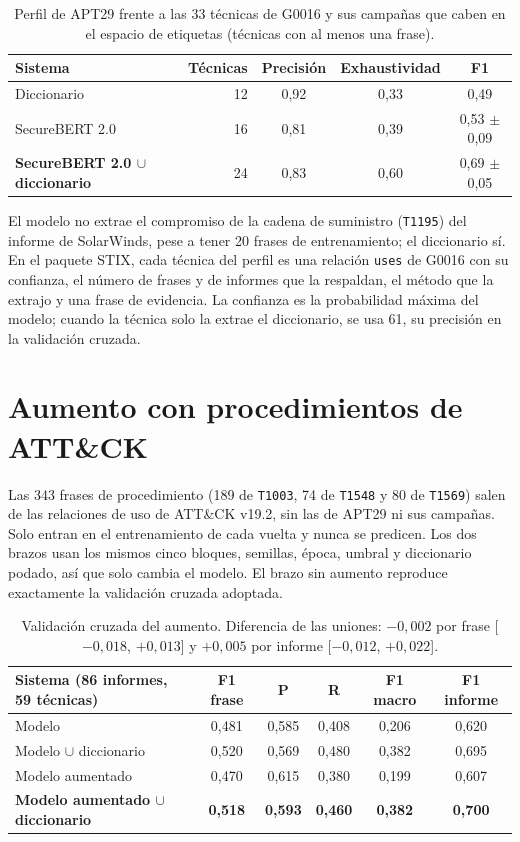 \begin{table}[H]
\centering
\begin{tabular}{|l|r|c|c|c|}
\hline
\textbf{Sistema} & \textbf{Técnicas} & \textbf{Precisión} & \textbf{Exhaustividad} & \textbf{F1} \\
\hline
Diccionario & 12 & 0,92 & 0,33 & 0,49 \\
SecureBERT 2.0 & 16 & 0,81 & 0,39 & 0,53 $\pm$ 0,09 \\
\textbf{SecureBERT 2.0 $\cup$ diccionario} & 24 & 0,83 & 0,60 & 0,69 $\pm$ 0,05 \\
\hline
\end{tabular}
\caption{Perfil de APT29 frente a las 33 técnicas de G0016 y sus campañas que caben en el espacio
de etiquetas (técnicas con al menos una frase).}
\end{table}

El modelo no extrae el compromiso de la cadena de suministro (\texttt{T1195}) del informe de
SolarWinds, pese a tener 20 frases de entrenamiento; el diccionario sí. En el paquete STIX, cada
técnica del perfil es una relación \texttt{uses} de G0016 con su confianza, el número de frases y
de informes que la respaldan, el método que la extrajo y una frase de evidencia. La confianza es
la probabilidad máxima del modelo; cuando la técnica solo la extrae el diccionario, se usa 61, su
precisión en la validación cruzada.

\section{Aumento con procedimientos de ATT\&CK}

Las 343 frases de procedimiento (189 de \texttt{T1003}, 74 de \texttt{T1548} y 80 de
\texttt{T1569}) salen de las relaciones de uso de ATT\&CK v19.2, sin las de APT29 ni sus campañas.
Solo entran en el entrenamiento de cada vuelta y nunca se predicen. Los dos brazos usan los mismos
cinco bloques, semillas, época, umbral y diccionario podado, así que solo cambia el modelo. El
brazo sin aumento reproduce exactamente la validación cruzada adoptada.

\begin{table}[H]
\centering
\begin{tabular}{|l|c|c|c|c|c|}
\hline
\textbf{Sistema (86 informes, 59 técnicas)} & \textbf{F1 frase} & \textbf{P} & \textbf{R} & \textbf{F1 macro} & \textbf{F1 informe} \\
\hline
Modelo & 0,481 & 0,585 & 0,408 & 0,206 & 0,620 \\
Modelo $\cup$ diccionario & 0,520 & 0,569 & 0,480 & 0,382 & 0,695 \\
Modelo aumentado & 0,470 & 0,615 & 0,380 & 0,199 & 0,607 \\
\textbf{Modelo aumentado $\cup$ diccionario} & \textbf{0,518} & \textbf{0,593} & \textbf{0,460} & \textbf{0,382} & \textbf{0,700} \\
\hline
\end{tabular}
\caption{Validación cruzada del aumento. Diferencia de las uniones: $-0{,}002$ por frase
[$-0{,}018$, $+0{,}013$] y $+0{,}005$ por informe [$-0{,}012$, $+0{,}022$].}
\end{table}

